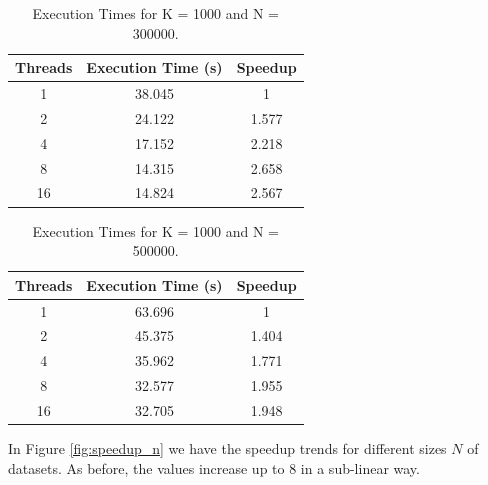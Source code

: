 \documentclass[10pt,twocolumn,letterpaper]{article}
\begin{document}
\begin{table}[H]
	\begin{center}
		\begin{tabular}{|c|c|c|}
			\hline
			Threads & Execution Time (s) & Speedup \\
			\hline
			1 & 38.045 & 1 \\ 
			2 & 24.122 & 1.577 \\
			4 & 17.152 & 2.218 \\
			8 & 14.315 & 2.658 \\ 
			16 & 14.824 & 2.567 \\
			\hline
		\end{tabular}
	\end{center}
	\caption{Execution Times for K = 1000 and N = 300000.}
	\label{tab:speedup_k_n_7}
\end{table}

\begin{table}[H]
	\begin{center}
		\begin{tabular}{|c|c|c|}
			\hline
			Threads & Execution Time (s) & Speedup \\
			\hline
			1 & 63.696 & 1 \\ 
			2 & 45.375 & 1.404 \\
			4 & 35.962 & 1.771 \\
			8 & 32.577 & 1.955 \\ 
			16 & 32.705 & 1.948 \\
			\hline
		\end{tabular}
	\end{center}
	\caption{Execution Times for K = 1000 and N = 500000.}
	\label{tab:speedup_k_n_8}
\end{table}

In Figure \ref{fig:speedup_n} we have the speedup trends for different sizes $N$ of datasets. As before, the values increase up to 8 in a sub-linear way.
\end{document}
